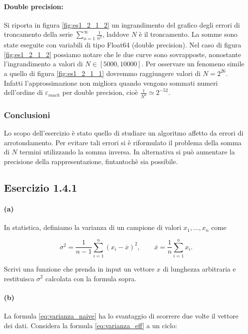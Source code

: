 \documentclass[letterpaper, 12pt]{article}
\numberwithin{equation}{section}    %
\begin{document}
\paragraph{Double precision:}Si riporta in figura \ref{fig:es1_2_1_2} un ingrandimento 
del grafico degli errori di troncamento della serie 
$\sum_{n=1}^\infty \frac{1}{n^2}$, laddove $N$ è il troncamento. La somme sono state eseguite
con variabili di tipo Float64 (double precision). 
Nel caso di figura \ref{fig:es1_2_1_2} possiamo notare che le due curve sono sovrapposte,
nonostante l'ingrandimento a valori di $N \in [5000, 10000]$. Per osservare un fenomeno simile a quello di 
figura \ref{fig:es1_2_1_1} dovremmo raggiungere valori di $N = 2^{26}$. Infatti l'approssimazione non migliora
quando vengono sommati numeri dell'ordine di $\varepsilon_{mach}$ per double precision, cioè
 $\frac{1}{N^2} \simeq 2^{-52}$.

\subsubsection{Conclusioni}
Lo scopo dell'esercizio è stato quello di studiare un algoritmo affetto da errori di arrotondamento. Per 
evitare tali errori si è riformulato il problema della somma di $N$ termini utilizzando la somma inversa. In 
alternativa si può aumentare la precisione della rappresentazione, fintantochè sia possibile.

\subsection{Esercizio 1.4.1}
\paragraph{(a)}In statistica, definiamo la varianza di un campione di valori $x_1,\ldots,x_n$ come

\begin{equation}
    \sigma^2 = \frac{1}{n-1} \sum_{i=1}^n (x_i - \overline{x})^2,
    \qquad 
    \overline{x} = \frac{1}{n} \sum_{i=1}^n x_i.
    \label{eq:varianza_naive}
\end{equation}

Scrivi una funzione che prenda in input un vettore $x$ di lunghezza arbitraria e restituisca $\sigma^2$ calcolata 
con la formula sopra. 

\paragraph{(b)} La formula \ref{eq:varianza_naive} ha lo svantaggio di scorrere due volte il vettore dei dati. 
Considera la formula \ref{eq:varianza_eff} a un ciclo:
\end{document}
